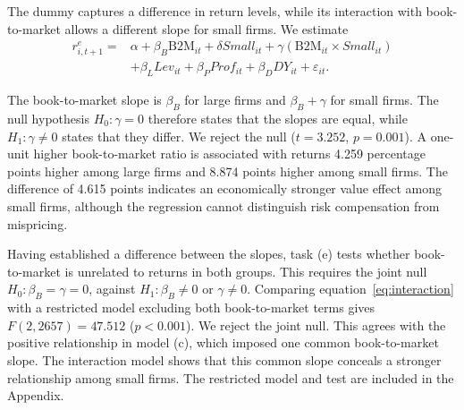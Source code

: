 

The dummy captures a difference in return levels, while its interaction with book-to-market allows a different slope for small firms. We estimate
\begin{equation}
\begin{aligned}
r^e_{i,t+1}={}&\alpha+\beta_B \mathrm{B2M}_{it}+\delta Small_{it}
+\gamma(\mathrm{B2M}_{it}\times Small_{it})\\
&+\beta_L Lev_{it}+\beta_P Prof_{it}+\beta_D DY_{it}+\varepsilon_{it}.
\end{aligned}
\label{eq:interaction}
\end{equation}

\begin{samepage}
The book-to-market slope is $\beta_B$ for large firms and $\beta_B+\gamma$ for small firms. The null hypothesis $H_0\colon\gamma=0$ therefore states that the slopes are equal, while $H_1\colon\gamma\neq0$ states that they differ. We reject the null ($t=3.252$, $p=0.001$). A one-unit higher book-to-market ratio is associated with returns 4.259 percentage points higher among large firms and 8.874 points higher among small firms. The difference of 4.615 points indicates an economically stronger value effect among small firms, although the regression cannot distinguish risk compensation from mispricing.
\par
\end{samepage}

Having established a difference between the slopes, task (e) tests whether book-to-market is unrelated to returns in both groups. This requires the joint null $H_0\colon\beta_B=\gamma=0$, against $H_1\colon\beta_B\neq0$ or $\gamma\neq0$. Comparing equation~\eqref{eq:interaction} with a restricted model excluding both book-to-market terms gives $F(2,2657)=47.512$ ($p<0.001$). We reject the joint null. This agrees with the positive relationship in model (c), which imposed one common book-to-market slope. The interaction model shows that this common slope conceals a stronger relationship among small firms. The restricted model and test are included in the Appendix.

